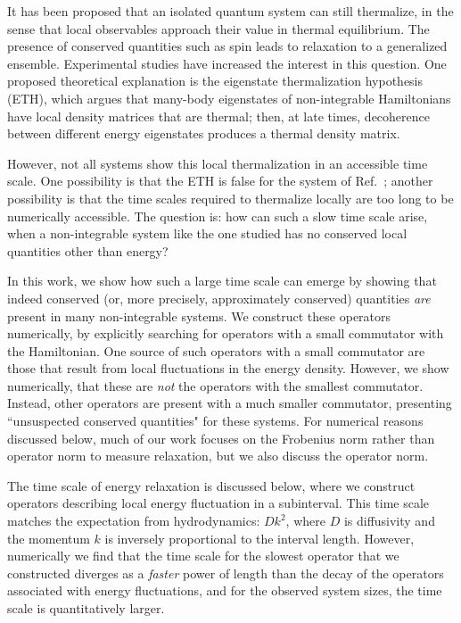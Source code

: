 \documentclass[twocolumn,superscriptaddress, prb]{revtex4-1}
\begin{document}
It has been proposed that an isolated quantum system can still thermalize, in the sense that local observables approach their value in thermal  equilibrium\cite{Deutsch:1991,Srednicki:1994,Rigol:2008}.  The presence of conserved quantities such as spin leads to relaxation to a generalized ensemble.  Experimental studies have increased the interest in this question\cite{Polkovnikov:2011, Yukalov:2011}.  One proposed theoretical explanation is the eigenstate thermalization hypothesis (ETH)\cite{Deutsch:1991,Srednicki:1994,Rigol:2008,Santos:2010,Rigol:2012,Kruczenski:2013,Beugeling:2014,Sorg:2014,Kim_ETH,Goldstein:2014}, which argues that many-body eigenstates of non-integrable Hamiltonians have local density matrices that are thermal; then, at late times, decoherence between different energy eigenstates produces a thermal density matrix.

However, not all systems show this local thermalization in an accessible time scale\cite{Banuls:2011}.
One possibility is that the ETH is false for the system of Ref.~; another possibility is that the time scales required to thermalize locally are too long to be numerically accessible.  The question is: how can such a slow time scale arise, when a non-integrable system like the one studied has no conserved local quantities other than energy?

In this work, we show how such a large time scale can emerge by showing that indeed conserved (or, more precisely, approximately conserved) quantities {\it are} present in many non-integrable systems.  We construct these operators numerically, by explicitly searching for operators with a small commutator with the Hamiltonian.  One source of such operators with a small commutator are those that result from local fluctuations in the energy density.  However, we show numerically, that these are {\it not} the operators with the smallest commutator.  Instead, other operators are present with a much smaller commutator, presenting ``unsuspected conserved quantities" for these systems.  For numerical reasons discussed below, much of our work focuses on the Frobenius norm rather than operator norm to measure relaxation, but we also discuss the operator norm.


The time scale of energy relaxation is discussed below, where we construct operators describing local energy fluctuation in a subinterval.  This time scale matches the expectation
 from hydrodynamics:
$D k^2$, where $D$ is diffusivity and the momentum $k$ is inversely proportional to the interval length.
However, numerically we find that the time scale for the slowest operator that we constructed diverges as a {\it faster} power of length than the decay of the operators associated with energy fluctuations, and for the observed system sizes, the time scale is quantitatively larger.
\end{document}

